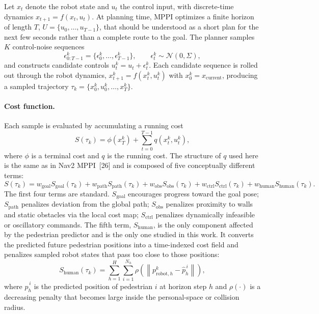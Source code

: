 \documentclass[12pt, a4paper]{article}
\begin{document}
Let $x_t$ denote the robot state and $u_t$ the control input, with discrete-time dynamics $x_{t+1}=f(x_t,u_t)$. At planning time, MPPI optimizes a finite horizon of length $T$, $U=\{u_0,\ldots,u_{T-1}\}$, that should be understood as a short plan for the next few seconds rather than a complete route to the goal. The planner samples $K$ control-noise sequences
\[
\epsilon^k_{0:T-1}
=
\{\epsilon^k_0,\ldots,\epsilon^k_{T-1}\},
\qquad
\epsilon^k_t \sim \mathcal{N}(0,\Sigma),
\]
and constructs candidate controls $u^k_t = u_t + \epsilon^k_t$. Each candidate sequence is rolled out through the robot dynamics, $x^k_{t+1}=f(x^k_t,u^k_t)$ with $x^k_0=x_{\mathrm{current}}$, producing a sampled trajectory $\tau_k=\{x^k_0,u^k_0,\ldots,x^k_T\}$.

\paragraph{Cost function.} Each sample is evaluated by accumulating a running cost
\[
S(\tau_k) = \phi(x^k_T) + \sum_{t=0}^{T-1} q(x^k_t, u^k_t),
\]
where $\phi$ is a terminal cost and $q$ is the running cost. The structure of $q$ used here is the same as in Nav2 MPPI~[26] and is composed of five conceptually different terms:
\[
S(\tau_k)
=
w_{\mathrm{goal}} S_{\mathrm{goal}}(\tau_k)
+w_{\mathrm{path}} S_{\mathrm{path}}(\tau_k)
+w_{\mathrm{obs}} S_{\mathrm{obs}}(\tau_k)
+w_{\mathrm{ctrl}} S_{\mathrm{ctrl}}(\tau_k)
+w_{\mathrm{human}} S_{\mathrm{human}}(\tau_k).
\]
The first four terms are standard. $S_{\mathrm{goal}}$ encourages progress toward the goal pose; $S_{\mathrm{path}}$ penalizes deviation from the global path; $S_{\mathrm{obs}}$ penalizes proximity to walls and static obstacles via the local cost map; $S_{\mathrm{ctrl}}$ penalizes dynamically infeasible or oscillatory commands. The fifth term, $S_{\mathrm{human}}$, is the only component affected by the pedestrian predictor and is the only one studied in this work. It converts the predicted future pedestrian positions into a time-indexed cost field and penalizes sampled robot states that pass too close to those positions:
\begin{equation}
S_{\mathrm{human}}(\tau_k)
=
\sum_{h=1}^{H}\sum_{i=1}^{N_h}
\rho\!\left(
\left\|p^k_{\mathrm{robot},h}-\hat{p}^{\,i}_{h}\right\|
\right),
\label{eq:human-cost}
\end{equation}
where $\hat{p}^{\,i}_{h}$ is the predicted position of pedestrian $i$ at horizon step $h$ and $\rho(\cdot)$ is a decreasing penalty that becomes large inside the personal-space or collision radius.
\end{document}
